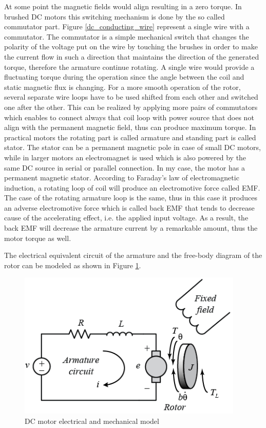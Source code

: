 \documentclass[12pt,english,twoside]{article}
\begin{document}
At some point the magnetic fields would align resulting in a zero torque. In brushed DC motors this switching mechanism is done by the so called commutator part. Figure \ref{dc_conducting_wire} represent a single wire with a commutator. The commutator is a simple mechanical switch that changes the polarity of the voltage put on the wire by touching the brushes in order to make the current flow in such a direction that maintains the direction of the generated torque, therefore the armature continue rotating. A single wire would provide a fluctuating torque during the operation since the angle between the coil and static magnetic flux is changing. For a more smooth operation of the rotor, several separate wire loops have to be used shifted from each other and switched one after the other. This can be realized by applying more pairs of commutators which enables to connect always that coil loop with power source that does not align with the permanent magnetic field, thus can produce maximum torque. In practical motors the rotating part is called armature and standing part is called stator. The stator can be a permanent magnetic pole in case of small DC motors, while in larger motors an electromagnet is used which is also powered by the same DC source in serial or parallel connection. In my case, the motor has a permanent magnetic stator.
According to Faraday's law of electromagnetic induction, a rotating loop of coil will produce an electromotive force called EMF. The case of the rotating armature loop is the same, thus in this case it produces an adverse electromotive force which is called back EMF that tends to decrease cause of the accelerating effect, i.e. the applied input voltage. As a result, the back EMF will decrease the armature current by a remarkable amount, thus the motor torque as well. \cite{dc_motor_1} \cite{dc_motor_2}

The electrical equivalent circuit of the armature and the free-body diagram of the rotor can be modeled as shown in Figure \ref{dc_motor_model}.
\begin{figure}[htb!]
	\centering
	\includegraphics[height=7cm]{figures/dc_motor_model.png}
	\caption{DC motor electrical and mechanical model \cite{dc_motor_3}}
	\label{dc_motor_model}
\end{figure}
\end{document}

